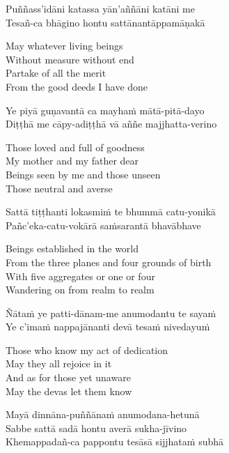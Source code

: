 Puññass'idāni katassa yān'aññāni katāni me\\
Tesañ-ca bhāgino hontu sattānantāppamāṇakā

\begin{english-verses}
  May whatever living beings\\
  Without measure without end\\
  Partake of all the merit\\
  From the good deeds I have done
\end{english-verses}

Ye piyā guṇavantā ca mayhaṁ mātā-pitā-dayo\\
Diṭṭhā me cāpy-adiṭṭhā vā aññe majjhatta-verino

\begin{english-verses}
  Those loved and full of goodness\\
  My mother and my father dear\\
  Beings seen by me and those unseen\\
  Those neutral and averse
\end{english-verses}

Sattā tiṭṭhanti lokasmiṁ te bhummā catu-yonikā\\
Pañc'eka-catu-vokārā saṁsarantā bhavābhave

\begin{english-verses}
  Beings established in the world\\
  From the three planes and four grounds of birth\\
  With five aggregates or one or four\\
  Wandering on from realm to realm
\end{english-verses}

Ñātaṁ ye patti-dānam-me anumodantu te sayaṁ\\
Ye c'imaṁ nappajānanti devā tesaṁ nivedayuṁ

\begin{english-verses}
  Those who know my act of dedication\\
  May they all rejoice in it\\
  And as for those yet unaware\\
  May the devas let them know
\end{english-verses}

Mayā dinnāna-puññānaṁ anumodana-hetunā\\
Sabbe sattā sadā hontu averā sukha-jīvino\\
Khemappadañ-ca pappontu tesāsā sijjhataṁ subhā

